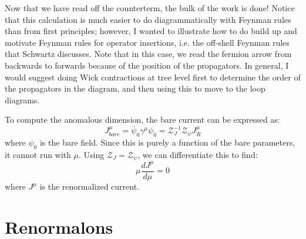 \documentclass[11pt, oneside]{article}   	%
\theoremstyle{definition}
\begin{document}
Now that we have read off the counterterm, the bulk of the work is done! Notice that this calculation is much easier to do 
diagrammatically with Feynman rules than from first principles; however, I wanted to illustrate how to do build up and 
motivate Feynman rules for operator insertions, i.e. the off-shell Feynman rules that Schwartz discusses. Note that in 
this case, we read the fermion arrow from backwards to forwards because of the position of the propagators. In general, 
I would suggest doing Wick contractions at tree level first to determine the order of the propagators in the diagram, and then 
using this to move to the loop diagrams. 

To compute the anomalous dimension, the bare current can be expressed as:
\begin{equation}
	J_{bare}^\mu = \overline\psi_0\gamma^\mu\psi_0 = \mathcal Z_J^{-1}\mathcal Z_\psi J_R^\mu
\end{equation}
where $\psi_0$ is the bare field. Since this is purely a function of the bare parameters, it cannot run with $\mu$. Using 
$\mathcal Z_J = \mathcal Z_\psi$, we can differentiate this to find:
\begin{equation}
	\mu \frac{dJ^\mu}{d\mu} = 0
\end{equation}
where $J^\mu$ is the renormalized current. 


\section{Renormalons}
\end{document}
